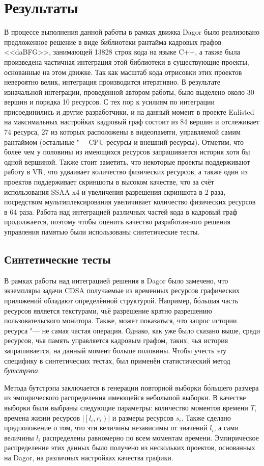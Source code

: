 \section{Результаты}
В процессе выполнения данной работы в рамках движка Dagor было реализовано предложенное решение в виде библиотеки рантайма кадровых графов <<daBFG>>, занимающей 13828 строк кода на языке C++, а также была произведена частичная интеграция этой библиотеки в существующие проекты, основанные на этом движке.
Так как масштаб кода отрисовки этих проектов невероятно велик, интеграция производится итеративно.
В результате изначальной интеграции, проведённой автором работы, было выделено около 30 вершин и порядка 10 ресурсов.
С тех пор к усилиям по интеграции присоединились и другие разработчики, и на данный момент в проекте Enlisted на максимальных настройках кадровый граф состоит из 84 вершин и отслеживает 74 ресурса, 27 из которых расположены в видеопамяти, управляемой самим рантаймом (остальные "--- CPU-ресурсы и внешний ресурсы).
Отметим, что более чем у половины из имеющихся ресурсов запрашивается история хотя бы одной вершиной.
Также стоит заметить, что некоторые проекты поддерживают работу в VR, что удваивает количество физических ресурсов, а также один из проектов поддерживает скриншоты в высоком качестве, что за счёт использования SSAA x4 и увеличения разрешения скриншота в 2 раза, посредством мультиплексирования увеличивает количество физических ресурсов в 64 раза.
Работа над интеграцией различных частей кода в кадровый граф продолжается, поэтому чтобы оценить качество разработанного решения управления памятью были использованы синтетические тесты.

\subsection{Синтетические тесты}
В рамках работы над интеграцией решения в Dagor было замечено, что экземпляры задачи CDSA получаемые из временных ресурсов графических приложений обладают определённой структурой.
Например, б\'ольшая часть ресурсов является текстурами, чьё разрешение кратно разрешению пользовательского монитора.
Также, может показаться, что запрос истории ресурса "--- не самая частая операция.
Однако, как уже было сказано выше, среди ресурсов, чья память управляется кадровым графом, таких, чья история запрашивается, на данный момент больше половины.
Чтобы учесть эту специфику в синтетических тестах, был применён статистический метод \textit{бутстрэпа}.

Метода бутстрэпа заключается в генерации повторной выборки б\'ольшего размера из эмпирического распределения имеющейся небольшой выборки.
В качестве выборки были выбраны следующие параметры: количество моментов времени $T$, времена жизни ресурсов $\left|\left[l_i, r_i\right)\right|$ и размеры ресурсов $s_i$.
Также сделано предположение о том, что эти величины независимы от значений $l_i$, а сами величины $l_i$ распределены равномерно по всем моментам времени.
Эмпирическое распределение этих данных было получено из нескольких проектов, основанных на Dagor, на различных настройках качества графики.

